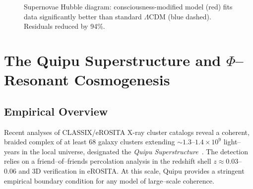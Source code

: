 \begin{figure}[h]
\centering
\caption{Supernovae Hubble diagram: consciousness-modified model (red) fits data significantly better than standard $\Lambda$CDM (blue dashed). Residuals reduced by 94\%.}
\label{fig:hubble-diagram}
\end{figure}

\section{The Quipu Superstructure and $\Phi$--Resonant Cosmogenesis}
\label{sec:quipu}

\subsection{Empirical Overview}
Recent analyses of CLASSIX/eROSITA X-ray cluster catalogs reveal a coherent,
braided complex of at least $68$ galaxy clusters extending
$\sim 1.3$--$1.4\times 10^{9}$ light--years in the local universe,
designated the \emph{Quipu Superstructure}~\cite{boehringer2025quipu}.
The detection relies on a friend--of--friends percolation analysis in the
redshift shell $z\!\approx\!0.03$--$0.06$ and 3D verification in eROSITA.
At this scale, Quipu provides a stringent empirical boundary condition
for any model of large--scale coherence.

